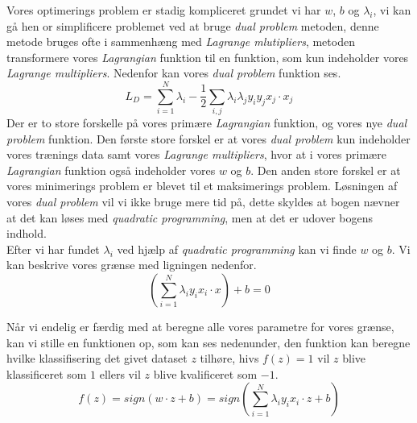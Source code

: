 \documentclass{article}
\begin{document}
Vores optimerings problem er stadig kompliceret grundet vi har $w$, $b$ og $\lambda_i$, vi kan gå hen or simplificere problemet ved at bruge \textit{dual problem} metoden, denne metode bruges ofte i sammenhæng med \textit{Lagrange mlutipliers}, metoden transformere vores \textit{Lagrangian} funktion til en funktion, som kun indeholder vores \textit{Lagrange multipliers}. Nedenfor kan vores \textit{dual problem} funktion ses.
$$L_D = \sum\limits_{i=1}^N \lambda_i - \frac{1}{2}\sum\limits_{i,j} \lambda_i \lambda_j y_i y_j x_j \cdot x_j$$
Der er to store forskelle på vores primære \textit{Lagrangian} funktion, og vores nye \textit{dual problem} funktion. Den første store forskel er at vores \textit{dual problem} kun indeholder vores trænings data samt vores \textit{Lagrange multipliers}, hvor at i vores primære \textit{Lagrangian} funktion også indeholder vores $w$ og $b$. Den anden store forskel er at vores minimerings problem  er blevet til et maksimerings problem.
Løsningen af vores \textit{dual problem} vil vi ikke bruge mere tid på, dette skyldes at bogen nævner at det kan løses med \textit{quadratic programming}, men at det er udover bogens indhold. \\
Efter vi har fundet $\lambda_i$ ved hjælp af \textit{quadratic programming} kan vi finde $w$ og $b$. Vi kan beskrive vores grænse med ligningen nedenfor.
$$( \sum\limits_{i=1}^N \lambda_i y_i x_i \cdot x) + b = 0$$

Når vi endelig er færdig med at beregne alle vores parametre for vores grænse, kan vi stille en funktionen op, som kan ses nedenunder, den funktion kan beregne hvilke klassifisering det givet dataset $z$ tilhøre, hivs $f(z) = 1$ vil $z$ blive klassificeret som $1$ ellers vil $z$ blive kvalificeret som $-1$. 
$$f(z) = sign(w \cdot z + b) = sign( \sum\limits_{i=1}^N \lambda_i y_i x_i \cdot z + b)$$
\end{document}

